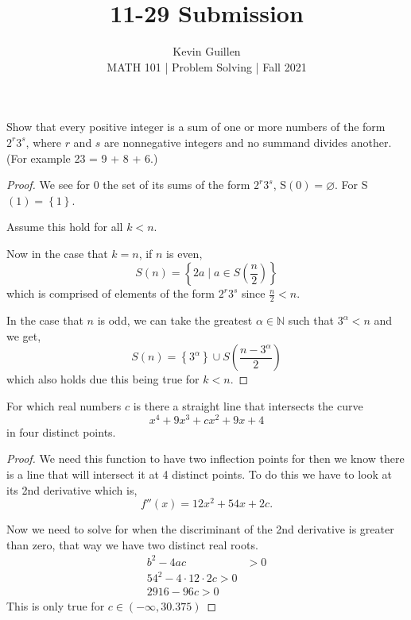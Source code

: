 \documentclass[11pt]{article}
\newenvironment{problem}[2][Problem\!]{\begin{trivlist}
\item[\hskip \labelsep {\bfseries #1}\hskip \labelsep {\bfseries #2}]}{\end{trivlist}}
\newcommand{\nn}{\mathbb N}   %
\newcommand{\set}[1]{\left\{#1\right\}} %
\renewcommand{\emptyset}{\varnothing}
\begin{document}
 
\title{11-29 Submission}
\author{Kevin Guillen\\[0.5em]
MATH 101 | Problem Solving | Fall 2021}
\date{} 
\maketitle


\begin{tcolorbox}
  \begin{problem} {IC | 11-22 | PP2}
    Show that every positive integer is a sum of one or more numbers of the form $2^{r}3^{s}$, where $r$ and $s$ are nonnegative integers and no summand divides another. (For example 23 = 9 + 8 + 6.)
  \end{problem}
\end{tcolorbox}
\begin{proof}
    We see for 0 the set of its sums of the form $2^{r}3^{s}$, S$(0) = \emptyset$. For S$(1) = \set{1}$. 

    Assume this hold for all $k < n$.

    Now in the case that $k = n$, if $n$ is even, \[S(n) = \set{2a \mid a \in S(\frac{n}{2})}\] which is comprised of elements of the form $2^{r}3^{s}$ since $\frac{n}{2} < n$.

    In the case that $n$ is odd, we can take the greatest $\alpha\in \nn$ such that $3^{\alpha} < n$ and we get, \[S(n) = \set{3^{\alpha}}\cup S(\dfrac{n - 3^{\alpha}}{2})\]
    which also holds due this being true for $k < n$. 
\end{proof}

\begin{tcolorbox}
    \begin{problem} {IC | 11-22 | PP14}
        For which real numbers $c$ is there a straight line that intersects the curve \[x^{4} + 9x^{3} + cx^{2} + 9x + 4\]
        in four distinct points. 
    \end{problem}
\end{tcolorbox}
\begin{proof}
    We need this function to have two inflection points for then we know there is a line that will intersect it at 4 distinct points. To do this we have to look at its 2nd derivative which is,
    \[f''(x) = 12x^{2} + 54x + 2c.\]

    Now we need to solve for when the discriminant of the 2nd derivative is greater than zero, that way we have two distinct real roots. 
    \begin{align*}
        b^{2} - 4ac &> 0 \\
        54^{2} - 4\cdot12 \cdot 2c  > 0 \\
        2916 - 96c > 0 
    \end{align*}
    This is only true for $c \in (-\infty,30.375)$

\end{proof}
\end{document}
